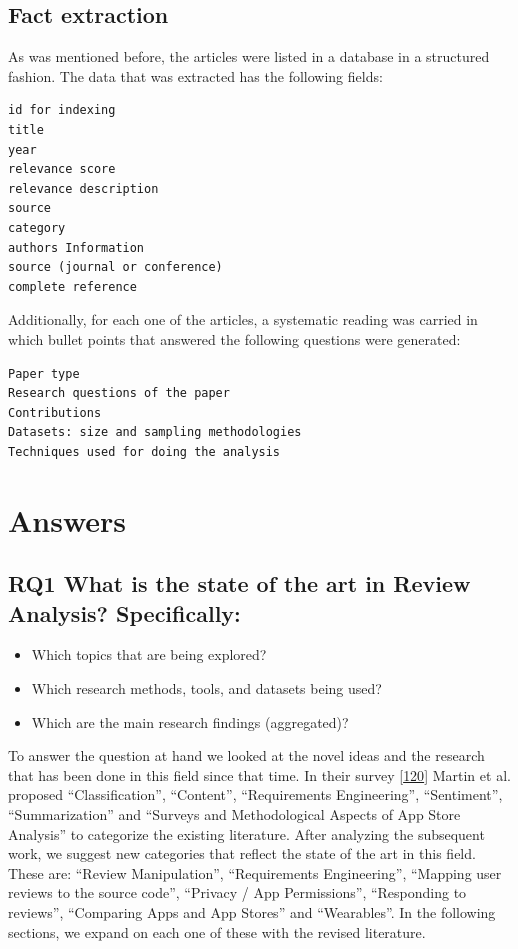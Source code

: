 \documentclass[]{book}
\providecommand{\tightlist}{%
  \setlength{\itemsep}{0pt}\setlength{\parskip}{0pt}}
\begin{document}
\subsection{Fact extraction}\label{fact-extraction}

As was mentioned before, the articles were listed in a database in a
structured fashion. The data that was extracted has the following
fields:

\begin{verbatim}
id for indexing
title
year 
relevance score 
relevance description 
source 
category
authors Information
source (journal or conference)
complete reference
\end{verbatim}

Additionally, for each one of the articles, a systematic reading was
carried in which bullet points that answered the following questions
were generated:

\begin{verbatim}
Paper type
Research questions of the paper
Contributions
Datasets: size and sampling methodologies
Techniques used for doing the analysis 
\end{verbatim}

\section{Answers}\label{answers-5}

\subsection{\texorpdfstring{\textbf{RQ1} What is the state of the art in
Review Analysis?
Specifically:}{RQ1 What is the state of the art in Review Analysis? Specifically:}}\label{rq1-what-is-the-state-of-the-art-in-review-analysis-specifically}

\begin{itemize}
\tightlist
\item
  Which topics that are being explored?
\item
  Which research methods, tools, and datasets being used?
\item
  Which are the main research findings (aggregated)?
\end{itemize}

To answer the question at hand we looked at the novel ideas and the
research that has been done in this field since that time. In their
survey {[}\protect\hyperlink{ref-martin2015survey}{120}{]} Martin et al.
proposed ``Classification'', ``Content'', ``Requirements Engineering'',
``Sentiment'', ``Summarization'' and ``Surveys and Methodological
Aspects of App Store Analysis'' to categorize the existing literature.
After analyzing the subsequent work, we suggest new categories that
reflect the state of the art in this field. These are: ``Review
Manipulation'', ``Requirements Engineering'', ``Mapping user reviews to
the source code'', ``Privacy / App Permissions'', ``Responding to
reviews'', ``Comparing Apps and App Stores'' and ``Wearables''. In the
following sections, we expand on each one of these with the revised
literature.
\end{document}
